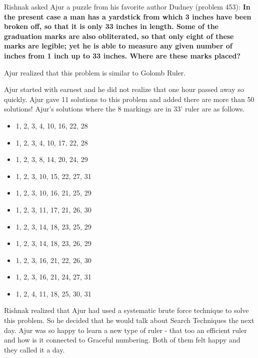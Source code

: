 Rishnak asked Ajur a puzzle from his favorite author Dudney (problem 453):
\textbf{In the present case a man has a yardstick from which 3 inches have
been broken off, so that it is only 33 inches in length. Some of the graduation
marks are also obliterated, so that only eight of these marks are legible; yet
he is able to measure any given number of inches from 1 inch up to 33 inches.
Where are these marks placed? }

Ajur realized that this problem is similar to Golomb Ruler. 

Ajur started with earnest and he did not realize that one hour passed away so quickly. Ajur gave 11 solutions to this problem and added there are more than 50 solutions! Ajur's solutions where the 8 markings are in 33' ruler are as follows.
\begin{itemize}
    \item 1, 2, 3, 4, 10, 16, 22, 28
    \item 1, 2, 3, 4, 10, 17, 22,  28
    \item 1, 2, 3, 8, 14, 20, 24, 29
    \item 1, 2, 3, 10, 15, 22, 27, 31
    \item 1, 2, 3, 10, 16, 21, 25, 29
     \item 1, 2, 3, 11, 17, 21, 26, 30
     \item 1, 2, 3, 14, 18, 23, 25, 29
     \item 1, 2, 3, 14, 18, 23, 26, 29
     \item 1, 2, 3, 16, 21, 22, 26, 30
     \item 1, 2, 3, 16, 21, 24, 27, 31
     \item 1, 2, 4, 11, 18, 25, 30, 31
\end{itemize}
Rishnak  realized that Ajur had used a systematic brute force technique to solve this problem. So he decided that he would talk about Search Techniques the next day.
Ajur was so happy to learn a new type of ruler - that too an efficient ruler and how is it connected to Graceful numbering. Both of them felt happy and they called it a day.